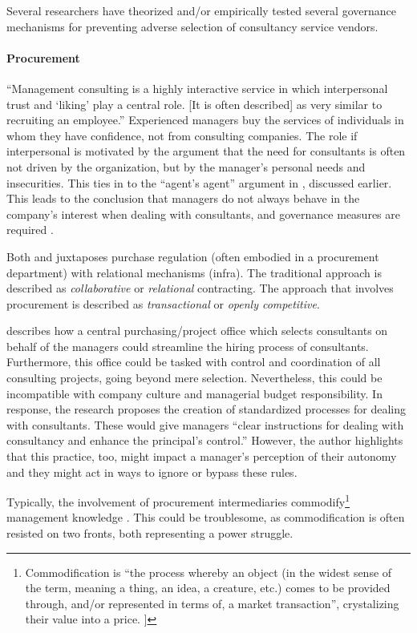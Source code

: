 \documentclass[12pt]{article}
\begin{document}
Several researchers have theorized and/or empirically tested several
governance mechanisms for preventing adverse selection of consultancy
service vendors.

\paragraph{Procurement}\label{procurement}

``Management consulting is a highly interactive service in which
interpersonal trust and `liking' play a central role. {[}It is often
described{]} as very similar to recruiting an employee.'' \citep[
185]{furusten2005} Experienced managers buy the services of individuals
in whom they have confidence, not from consulting companies. The role if
interpersonal is motivated by the argument that the need for consultants
is often not driven by the organization, but by the manager's personal
needs and insecurities. This ties in to the ``agent's agent'' argument
in \citet{fincham2002}, discussed earlier. This leads to the conclusion
that managers do not always behave in the company's interest when
dealing with consultants, and governance measures are required \citep[
300]{honer2006}.

Both \citet[4-5]{sturdy2021} and \citet[164]{lonsdale2017} juxtaposes
purchase regulation (often embodied in a procurement department) with
relational mechanisms (infra). The traditional approach is described as
\emph{collaborative} or \emph{relational} contracting. The approach that
involves procurement is described as \emph{transactional} or
\emph{openly competitive}.

\citet[307]{honer2006} describes how a central purchasing/project office
which selects consultants on behalf of the managers could streamline the
hiring process of consultants. Furthermore, this office could be tasked
with control and coordination of all consulting projects, going beyond
mere selection. Nevertheless, this could be incompatible with company
culture and managerial budget responsibility. In response, the research
proposes the creation of standardized processes for dealing with
consultants. These would give managers ``clear instructions for dealing
with consultancy and enhance the principal's control.'' However, the
author highlights that this practice, too, might impact a manager's
perception of their autonomy and they might act in ways to ignore or
bypass these rules.

Typically, the involvement of procurement intermediaries
commodify\footnote{Commodification is ``the process whereby an object
  (in the widest sense of the term, meaning a thing, an idea, a
  creature, etc.) comes to be provided through, and/or represented in
  terms of, a market transaction'', crystalizing their value into a
  price. \citep{carvalho2008}{]}} management knowledge \citep[
205-206]{omahoney2013}. This could be troublesome, as commodification is
often resisted on two fronts, both representing a power struggle.
\end{document}
